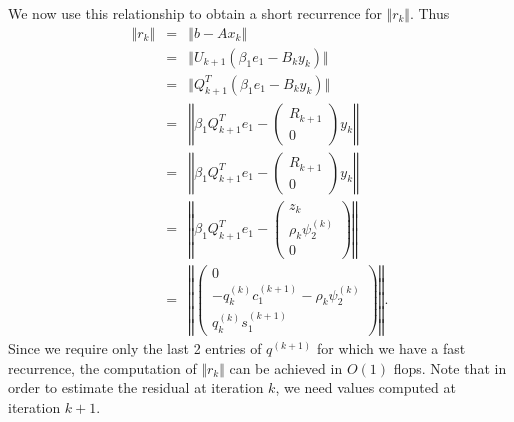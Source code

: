 \documentclass[11pt]{article}
\begin{document}
We now use this relationship to obtain a short recurrence for $\Vert r_k \Vert$. Thus
\begin{eqnarray*}
\Vert r_k \Vert &=& \Vert b - A x_k \Vert \\
&=& \Vert U_{k+1} (\beta_1 e_1 - B_k y_k) \Vert \\
&=& \Vert Q^T_{k+1} (\beta_1 e_1 - B_k y_k) \Vert \\
&=& \left\Vert \beta_1 Q^T_{k+1} e_1 - \begin{pmatrix} R_{k+1} \\ 0 \end{pmatrix} y_k \right\Vert \\
&=& \left\Vert \beta_1 Q^T_{k+1} e_1 - \begin{pmatrix} R_{k+1} \\ 0 \end{pmatrix} y_k \right\Vert \\
&=& \left\Vert \beta_1 Q^T_{k+1} e_1 - \begin{pmatrix} z_k \\ \rho_k \psi^{(k)}_2 \\ 0 \end{pmatrix} \right\Vert \\
&=& \left\Vert \begin{pmatrix}
0 \\ -q^{(k)}_k c^{(k+1)}_1 - \rho_k \psi^{(k)}_2 \\ q^{(k)}_k s^{(k+1)}_1 
\end{pmatrix} \right\Vert.
\end{eqnarray*}
Since we require only the last 2 entries of $q^{(k+1)}$ for which we have a fast recurrence, the computation of $\Vert r_k \Vert$ can be achieved in $O(1)$ flops. Note that in order to estimate the residual at iteration $k$, we need values computed at iteration $k+1$.
\end{document}
